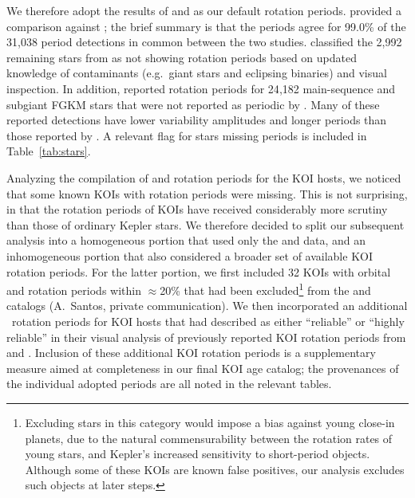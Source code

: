 \documentclass[11pt,twocolumn,tighten]{aastex63}
\begin{document}
We therefore adopt the results of  and
 as our default rotation periods.
 provided a comparison against
; the brief summary is that the periods
agree for 99.0\% of the 31{,}038 period detections in common between
the two studies.   classified the 2{,}992
remaining stars from  as not showing
rotation periods based on updated knowledge of contaminants
(e.g.~giant stars and eclipsing binaries) and visual inspection.  In
addition,  reported rotation periods for
24{,}182 main-sequence and subgiant FGKM stars that were not reported
as periodic by .  Many of these reported
detections have lower variability amplitudes and longer periods than
those reported by .  A relevant flag for
stars missing  periods is included in
Table~\ref{tab:stars}.

Analyzing the compilation of  and
 rotation periods for the KOI hosts, we
noticed that some known KOIs with rotation periods were missing.
This is not surprising, in that the rotation periods of KOIs have
received considerably more scrutiny than those of ordinary Kepler
stars.
We therefore decided to split our subsequent analysis into a
homogeneous portion that used only the  and
 data, and an inhomogeneous portion that also
considered a broader set of available KOI rotation periods.
For the latter portion, we first included 32 KOIs with orbital and
rotation periods within $\approx$20\% that had been
excluded\footnote{Excluding stars in this category would impose a bias
against young close-in planets, due to the natural commensurability
between the rotation rates of young stars, and Kepler's increased
sensitivity to short-period objects.  Although some of these KOIs are
known false positives, our analysis excludes such objects at later
steps.}%
from the
 and  catalogs
(A.~Santos, private communication).
We then incorporated an additional \nnewdavidtwentyone\ rotation
periods for KOI hosts that
\citet{David_2021} had described as either ``reliable'' or ``highly
reliable'' in their visual analysis of previously reported KOI
rotation periods from \citet{McQuillan_2013,Walkowicz_2013,Mazeh_2015}
and \citet{Angus_2018}.
Inclusion of these additional KOI rotation periods is a
supplementary measure aimed at completeness in our final KOI age
catalog; the provenances of the individual adopted periods are all
noted in the relevant tables.
\end{document}
